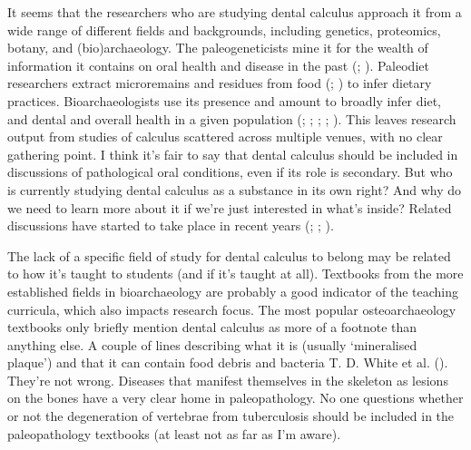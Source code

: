 \documentclass[
  b5paper,
]{book}
\begin{document}
It seems that the researchers who are studying dental calculus approach
it from a wide range of different fields and backgrounds, including
genetics, proteomics, botany, and (bio)archaeology. The paleogeneticists
mine it for the wealth of information it contains on oral health and
disease in the past (; ). Paleodiet researchers extract microremains
and residues from food (; ) to infer dietary practices. Bioarchaeologists use
its presence and amount to broadly infer diet, and dental and overall
health in a given population
(; ;
;
;
).
This leaves research output from studies of calculus scattered across
multiple venues, with no clear gathering point. I think it's fair to say
that dental calculus should be included in discussions of pathological
oral conditions, even if its role is secondary. But who is currently
studying dental calculus as a substance in its own right? And why do we
need to learn more about it if we're just interested in what's inside?
Related discussions have started to take place in recent years
(;
;
).

The lack of a specific field of study for dental calculus to belong may
be related to how it's taught to students (and if it's taught at all).
Textbooks from the more established fields in bioarchaeology are
probably a good indicator of the teaching curricula, which also impacts
research focus. The most popular osteoarchaeology textbooks only briefly
mention dental calculus as more of a footnote than anything else. A
couple of lines describing what it is (usually `mineralised plaque') and
that it can contain food debris and bacteria T. D. White et al.
(). They're not wrong.
Diseases that manifest themselves in the skeleton as lesions on the
bones have a very clear home in paleopathology. No one questions whether
or not the degeneration of vertebrae from tuberculosis should be
included in the paleopathology textbooks (at least not as far as I'm
aware).
\end{document}
